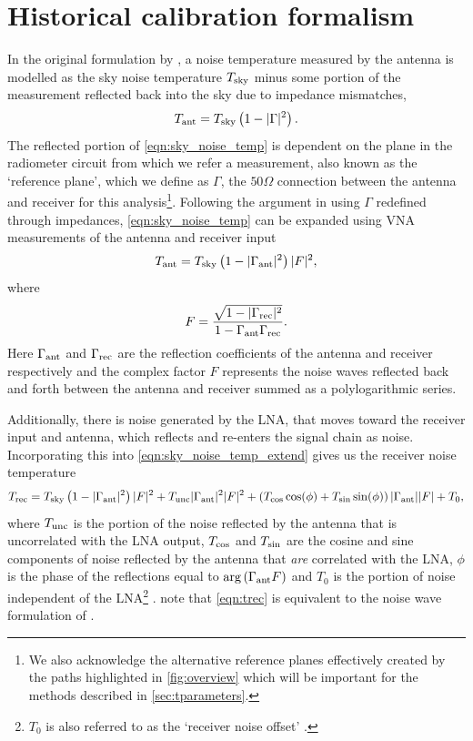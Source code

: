 \section{Historical calibration formalism}\label{sec:historic_cal}
In the original formulation by \citet{rogersCal}, a noise temperature measured by the antenna is modelled as the sky noise temperature $T_{\mathrm{sky}}$ minus some portion of the measurement reflected back into the sky due to impedance mismatches,
\begin{equation}
    T_{\mathrm{ant}} = T_{\mathrm{sky}} \left( 1 - |\Gamma|^2 \right).
    \label{eqn:sky_noise_temp}
\end{equation}
The reflected portion of \cref{eqn:sky_noise_temp} is dependent on the plane in the radiometer circuit from which we refer a measurement, also known as the ‘reference plane’, which we define as $\Gamma$, the $50\Omega$ connection between the antenna and receiver for this analysis\footnote{We also acknowledge the alternative reference planes effectively created by the paths highlighted in \cref{fig:overview} which will be important for the methods described in \cref{sec:tparameters}.}. Following the argument in \citep{rogersCal} using $\Gamma$ redefined through impedances, \cref{eqn:sky_noise_temp} can be expanded using VNA measurements of the antenna and receiver input
\begin{equation}
    T_{\mathrm{ant}} = T_{\mathrm{sky}} \left( 1 - |\Gamma_{\mathrm{ant}}|^2 \right) |F|^2,
    \label{eqn:sky_noise_temp_extend}
\end{equation}
where
\begin{equation}
    F = \frac{\sqrt{1-|\Gamma_{\mathrm{rec}}|^2}}{1-\Gamma_{\mathrm{ant}}\Gamma_{\mathrm{rec}}}.
    \label{eqn:f}
\end{equation}
Here $\Gamma_{\mathrm{ant}}$ and $\Gamma_{\mathrm{rec}}$ are the reflection coefficients of the antenna and receiver respectively and the complex factor $F$ represents the noise waves reflected back and forth between the antenna and receiver summed as a polylogarithmic series.

Additionally, there is noise generated by the LNA, that moves toward the receiver input and antenna, which reflects and re-enters the signal chain as noise. Incorporating this into \cref{eqn:sky_noise_temp_extend} gives us the receiver noise temperature
\begin{equation}
    T_{\mathrm{rec}} = T_{\mathrm{sky}} \left( 1 - |\Gamma_{\mathrm{ant}}|^2 \right) |F|^2 + T_{\mathrm{unc}}|\Gamma_{\mathrm{ant}}|^2|F|^2 + \left( T_{\mathrm{cos}}\cos(\phi) + T_{\mathrm{sin}}\sin(\phi) \right) |\Gamma_{\mathrm{ant}}||F| + T_0,
    \label{eqn:trec}
\end{equation}
where $T_{\mathrm{unc}}$ is the portion of the noise reflected by the antenna that is uncorrelated with the LNA output, $T_{\mathrm{cos}}$ and $T_{\mathrm{sin}}$ are the cosine and sine components of noise reflected by the antenna that \textit{are} correlated with the LNA, $\phi$ is the phase of the reflections equal to $\mathrm{arg}\left(\Gamma_{\mathrm{ant}}F\right)$ and $T_0$ is the portion of noise independent of the LNA\footnote{$T_0$ is also referred to as the ‘receiver noise offset’ \citep{edgesCal}.} \citep{rogersCal}. \citet{rogersCal} note that \cref{eqn:trec} is equivalent to the noise wave formulation of \citet{meys}.


